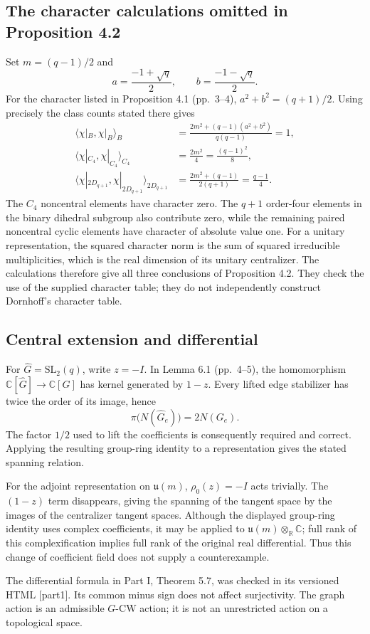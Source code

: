 \documentclass[10pt]{article}
\begin{document}
\subsection*{The character calculations omitted in Proposition 4.2}
Set \(m=(q-1)/2\) and \[a=\frac{-1+\sqrt q}{2},\qquad b=\frac{-1-\sqrt q}{2}.\] For the character listed in Proposition 4.1 (pp. 3–4), \(a^2+b^2=(q+1)/2\). Using precisely the class counts stated there gives \[\begin{aligned}
 \langle\chi|_B,\chi|_B\rangle_B
 &=\frac{2m^2+(q-1)(a^2+b^2)}{q(q-1)}=1,\\
 \langle\chi|_{C_4},\chi|_{C_4}\rangle_{C_4}
 &=\frac{2m^2}{4}=\frac{(q-1)^2}{8},\\
 \langle\chi|_{2D_{q+1}},\chi|_{2D_{q+1}}\rangle_{2D_{q+1}}
 &=\frac{2m^2+(q-1)}{2(q+1)}=\frac{q-1}{4}.\end{aligned}\] The \(C_4\) noncentral elements have character zero. The \(q+1\) order-four elements in the binary dihedral subgroup also contribute zero, while the remaining paired noncentral cyclic elements have character of absolute value one. For a unitary representation, the squared character norm is the sum of squared irreducible multiplicities, which is the real dimension of its unitary centralizer. The calculations therefore give all three conclusions of Proposition 4.2. They check the use of the supplied character table; they do not independently construct Dornhoff’s character table.\par
\subsection*{Central extension and differential}
For \(\widehat G=\mathrm{SL}_2(q)\), write \(z=-I\). In Lemma 6.1 (pp. 4–5), the homomorphism \(\mathbb C[\widehat G]\to\mathbb C[G]\) has kernel generated by \(1-z\). Every lifted edge stabilizer has twice the order of its image, hence \[\pi\bigl(N(\widehat G_e)\bigr)=2N(G_e).\] The factor \(1/2\) used to lift the coefficients is consequently required and correct. Applying the resulting group-ring identity to a representation gives the stated spanning relation.\par
For the adjoint representation on \(\mathfrak u(m)\), \(\rho_0(z)=-I\) acts trivially. The \((1-z)\) term disappears, giving the spanning of the tangent space by the images of the centralizer tangent spaces. Although the displayed group-ring identity uses complex coefficients, it may be applied to \(\mathfrak u(m)\otimes_{\mathbb R}\mathbb C\); full rank of this complexification implies full rank of the original real differential. Thus this change of coefficient field does not supply a counterexample.\par
The differential formula in Part I, Theorem 5.7, was checked in its versioned HTML [part1]. Its common minus sign does not affect surjectivity. The graph action is an admissible \(G\)-CW action; it is not an unrestricted action on a topological space.\par
\end{document}
